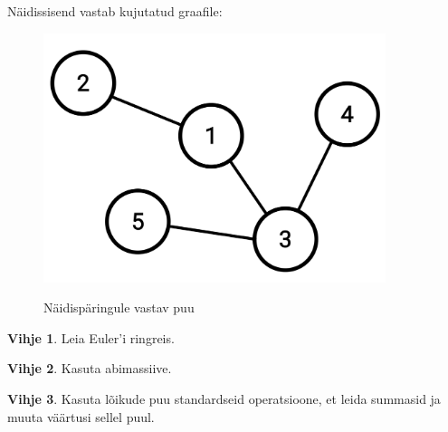 \documentclass{trkut}
\theoremstyle{definition}
\newtheorem*{vihje}{Vihje}
\begin{document}
Näidissisend vastab kujutatud graafile:
\begin{figure}[H]%
    \includegraphics[width=10cm]{ntpuu.jpeg}%
    \caption{Näidispäringule vastav puu}%
    \label{joonis}%
\end{figure}

\begin{vihje}
Leia Euler'i ringreis.    
\end{vihje}

\begin{vihje}
Kasuta abimassiive.
\end{vihje}

\begin{vihje}
Kasuta lõikude puu standardseid operatsioone, et leida summasid ja muuta väärtusi sellel puul.
\end{vihje}
\end{document}
